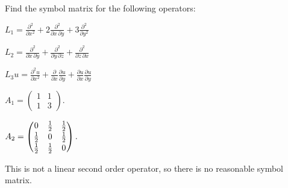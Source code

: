 Find the symbol matrix for the following operators:
\begin{teilaufgaben}
\item
$
\displaystyle
L_1
=
\frac{\partial^2}{\partial x^2}
+
2\frac{\partial^2}{\partial x\,\partial y}
+
3\frac{\partial^2}{\partial y^2}
$
\item
$
\displaystyle
L_2
=
\frac{\partial^2}{\partial x\,\partial y}
+
\frac{\partial^2}{\partial y\,\partial z}
+
\frac{\partial^2}{\partial z\,\partial x}
$
\item
$
\displaystyle
L_3u
=
\frac{\partial^2 u}{\partial x^2}
+
\frac{\partial }{\partial x}\frac{\partial u}{\partial y}
+
\frac{\partial u}{\partial x}\frac{\partial u}{\partial y}
$
\end{teilaufgaben}

\begin{loesung}
\begin{teilaufgaben}
\item
\(
\displaystyle
A_1
=
\begin{pmatrix}
1&1\\
1&3
\end{pmatrix}.
\)
\item
\(
\displaystyle
A_2
=
\renewcommand{\arraystretch}{1.1}
\begin{pmatrix}
0&\frac12&\frac12\\
\frac12&0&\frac12\\
\frac12&\frac12&0
\end{pmatrix}.
\)
\item
This is not a linear second order operator, so there is no reasonable
symbol matrix.
\qedhere
\end{teilaufgaben}
\end{loesung}

